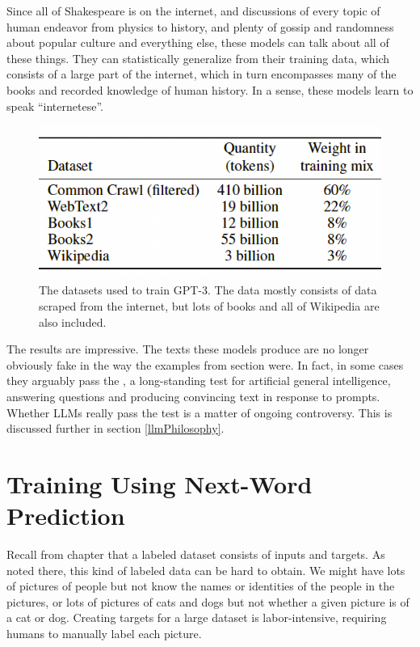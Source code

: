 Since all of Shakespeare is on the internet, and discussions of every topic of
human endeavor from physics to history, and plenty of gossip and randomness
about popular culture and everything else, these models can talk about all of
these things. They can statistically generalize from their training data, which
consists of a large part of the internet, which in turn encompasses many of the
books and recorded knowledge of human history. In a sense, these models learn
to speak ``internetese''. 

\begin{figure}[ht]
\centering
\includegraphics[scale=.4]{./images/gptDatasets}
\caption[From \cite{brown2020language}.]{The datasets used to train GPT-3. The
data mostly consists of data scraped from the internet, but lots of books and
all of Wikipedia are also included.
}
\label{gptDatasets}
\end{figure}

The results are impressive. The texts these models produce are no longer
obviously fake in the way the examples from section
 were. In fact, in some cases they arguably
pass the , a long-standing test for artificial general
intelligence, answering questions and producing convincing  text in response to
prompts. Whether LLMs really pass the test is a matter of ongoing controversy.
This is discussed further in section \ref{llmPhilosophy}.

\section{Training Using Next-Word Prediction}

Recall from chapter  that a labeled dataset consists of
inputs and targets. As noted there, this kind of labeled data can be hard to
obtain. We might have lots of pictures of people but not know the names or
identities of the people in the pictures, or lots of pictures of cats and dogs
but not whether a given picture is of a cat or dog. Creating targets for a
large dataset is labor-intensive, requiring humans to manually label each
picture.

